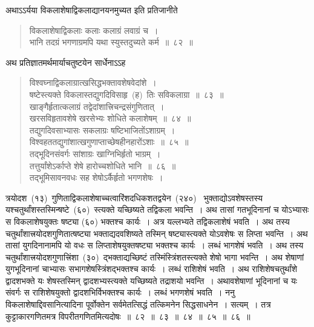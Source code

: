 \documentclass[11pt, openany]{book}
\begin{document}
\newpage
\thispagestyle{fancy}
\fancyhf{}
\indent
अथाऽऽर्यया विकलाशेषाद्विकलाद्यानयनमुच्यत इति प्रतिजानीते\textendash
\begin{quote}
{\ks विकलाशेषाद्विकलाः कलाः कलाग्रं लवाग्रं च~।\\
भानि तदग्रं भगणाग्रमपि यथा स्युस्तदुच्यते कर्म~॥~८२~॥}
\end{quote}
\indent
अथ प्रतिज्ञातमर्थमार्याचतुष्टयेन सार्धेनाऽऽह\textendash
\begin{quote}
{\ks विश्वघ्नाद्विकलाग्रात्खसिद्धभक्तावशेषवेदांशे~।\\
षष्टेस्त्यक्ते विकलास्तद्युगदिविसाहृ~(ह)~तिः सविकलाग्रा~॥~८३~॥\\
खाङ्गैर्हृतात्कलाग्रं तद्वेदांशात्त्रिचन्द्रसंगुणितात्~।\\
खरसविहृतावशेषे खरसेभ्यः शोधिते कलाशेषम्~॥~८४~॥\\
तद्युगदिवसाभ्यासः सकलाग्रः षष्टिभाजितोंऽशाग्रम्~।\\
विश्वहततद्युगांशात्खगुणाप्ताच्छेषहीनहारोंऽशाः~॥~८५~॥\\
तद्भूदिनसंवर्गः सांशाग्रः खाग्निभिर्हृतो भाग्रम्~।\\
तत्तुर्यांशेऽर्काप्ते शेषे हारोच्चशोधिते भानि~॥~८६~॥\\
तद्भूमिसावनवधः सह शेषोऽर्कैर्हृतो भगणशेषः~।}
\end{quote}
\indent
त्रयोदश~(१३)~गुणिताद्विकलाशेषाच्चत्वारिंशदधिकशतद्वयेन~(२४०)~ भुक्ताद्योऽवशेषस्तस्य यश्चतुर्थांशस्तस्मिन्षष्टे~(६०)~स्त्यक्ते यच्छिष्यते तद्विकला भवन्ति~। अथ तासां गतभूदिनानां च योऽभ्यासः स विकलाशेषयुक्तः षष्ट्या (६०) भक्तश्च कार्यः~। अत्र यल्लभ्यते तद्विकलाशेषं भवति~। अथ तस्य चतुर्थांशात्त्रयोदशगुणितात्षष्ट्या भक्ताद्यदवशिष्यते तस्मिन् षष्ट्यास्त्यक्ते योऽवशेषः स लिप्ता भवन्ति~। अथ तासां युगदिनानामपि यो वधः स लिप्ताशेषयुक्तषष्ट्या भक्तश्च कार्यः~। लब्धं भागशेषं भवति~।
अथ तस्य चतुर्थांशात्त्रयोदशगुणात्त्रिंशा~(३०)~द्भक्ताद्यच्छिष्टं तस्मिंस्त्रिंशतस्त्यक्ते शेषो भागा भवन्ति~। अथ शेषाणां युगभूदिनानां चाभ्यासः सभागशेषस्त्रिंशद्भक्तश्च कार्यः~। लब्धं राशिशेषं भवति~। अथ राशिशेषचतुर्थांशे द्वादशभक्ते यः शेषस्तस्मिन् द्वादशभ्यस्त्यक्ते यच्छिष्यते तद्राशयो भवन्ति~। अथावशेषाणां भूदिनानां च यः संवर्गः स राशिशेषयुक्तो द्वादशभिर्विभक्तश्च कार्यः~। लब्धं भगणशेषं भवति~। ननु विकलाशेषाद्दिवसानित्यादिना पूर्वोक्तेन सर्वमेतत्सिद्धं तत्किमनेन सिद्धसाधनेन~। सत्यम्~। तत्र कुट्टाकारगणितमत्र विपरीतगणितमित्यदोषः~॥~८२~॥~८३~॥~८४~॥~८५~॥~८६~॥
\end{document}
